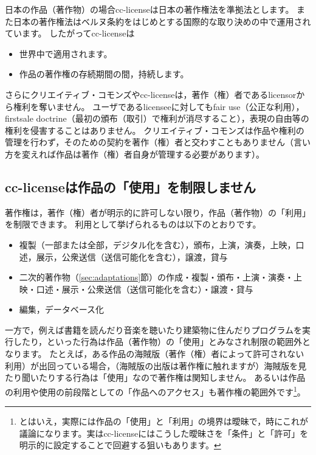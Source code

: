 \documentclass{ltjsarticle}
\begin{document}
日本の作品（著作物）の場合cc-licenseは日本の著作権法を準拠法とします。
また日本の著作権法はベルヌ条約をはじめとする国際的な取り決めの中で運用されています。
したがってcc-licenseは
\begin{itemize}
\item 世界中で適用されます。
\item 作品の著作権の存続期間の間，持続します。
\end{itemize}
さらにクリエイティブ・コモンズやcc-licenseは，著作（権）者であるlicensorから権利を奪いません。
ユーザであるlicenseeに対してもfair use（公正な利用），firstsale doctrine（最初の頒布（取引）で権利が消尽すること），表現の自由等の権利を侵害することはありません。
クリエイティブ・コモンズは作品や権利の管理を行わず，そのための契約を著作（権）者と交わすこともありません（言い方を変えれば作品は著作（権）者自身が管理する必要があります）。


\subsection{cc-licenseは作品の「使用」を制限しません} \label{sec:fair use}

著作権は，著作（権）者が明示的に許可しない限り，作品（著作物）の「利用」を制限できます。
利用として挙げられるものは以下のとおりです。
\begin{itemize}
\item 複製（一部または全部，デジタル化を含む），頒布，上演，演奏，上映，口述，展示，公衆送信（送信可能化を含む），譲渡，貸与
\item 二次的著作物（\ref{sec:adaptations}節）の作成・複製・頒布・上演・演奏・上映・口述・展示・公衆送信（送信可能化を含む）・譲渡・貸与
\item 編集，データベース化
\end{itemize}

一方で，例えば書籍を読んだり音楽を聴いたり建築物に住んだりプログラムを実行したり，といった行為は作品（著作物）の「使用」とみなされ制限の範囲外となります。
たとえば，ある作品の海賊版（著作（権）者によって許可されない利用）が出回っている場合，（海賊版の出版は著作権に触れますが）海賊版を見たり聞いたりする行為は「使用」なので著作権は関知しません。
あるいは作品の利用や使用の前段階としての「作品へのアクセス」も著作権の範囲外です\footnote{とはいえ，実際には作品の「使用」と「利用」の境界は曖昧で，時にこれが議論になります。実はcc-licenseにはこうした曖昧さを「条件」と「許可」を明示的に設定することで回避する狙いもあります。}。
\end{document}
